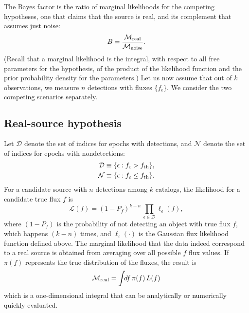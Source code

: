 \documentclass[twocolumn]{emulateapj}
\newcommand{\eind}{\epsilon}  %
\newcommand{\like}{\mathcal{L}}  %
\newcommand{\flike}{\ell}  %
\newcommand{\mlike}{\mathcal{M}}  %
\newcommand{\flux}{f}
\newcommand{\dtxn}{\mathcal{D}}  %
\newcommand{\ndtxn}{\mathcal{N}}  %
\newcommand{\fth}{\flux_{\rm th}}
\begin{document}
The Bayes factor is the ratio of marginal likelihoods for the competing hypotheses, one that claims that the source is real, and its complement that assumes just noise:
%
\begin{equation} \label{eq:Bfac}
B = \frac{\mlike_{\rm{}real}}{\mlike_{\rm{}noise}} .
\end{equation}
%
(Recall that a marginal likelihood is the integral, with respect to all free parameters for the hypothesis, of the product of the likelihood function and the prior probability density for the parameters.)
Let us now assume that out of $k$ observations, we measure $n$ detections with fluxes $\{f_\eind\}$. We consider the two competing scenarios separately.

\subsection{Real-source hypothesis}
\noindent
Let $\dtxn$ denote the set of indices for epochs with detections, and $\ndtxn$ denote the set of indices for epochs with nondetections:
\begin{equation}
\begin{split}
\dtxn  &\equiv \{\eind : \flux_\eind > \fth\},\\
\ndtxn &\equiv \{\eind : \flux_\eind \le \fth\}.
\end{split}
\label{D-ND-sets}
\end{equation}
For a candidate source with $n$ detections among $k$ catalogs, the likelihood for a candidate true flux $f$ is
%
\begin{equation}
\like(f) = (1\!-\!P_f)^{k-n}\,\prod_{\eind \in \dtxn} \flike_\eind(\flux),
\end{equation}
%
where \mbox{$(1\!-\!P_f)$} is the probability of not detecting an object with true flux $f$, which happens \mbox{$(k\!-\!n)$} times, and $\flike_\eind(\cdot)$ is the Gaussian flux likelihood function defined above.
%
The marginal likelihood that the data indeed correspond to a real source is obtained from averaging over all possible $f$ flux values. 
If $\pi(f)$ represents the true distribution of the fluxes, the result is
%
\begin{equation}
\mlike_{\rm{}real} = \int\!\!df\,\pi(f)\,L(f)
\end{equation}
%
which is a one-dimensional integral that can be analytically or numerically quickly evaluated.


\end{document}
